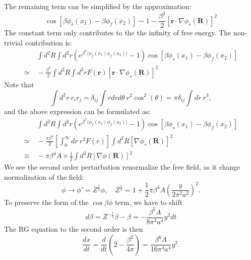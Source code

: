 The remaining term can be simplified by the approximation:
\begin{equation}
	\cos\left[\beta\phi_s(x_1) -\beta\phi_f(x_2)\right]
	\sim 1-\frac{\beta^2}{2} [\bm r \cdot \nabla\phi_s(\bm R)]^2
\end{equation}
The constant term only contributes to the the infinity of free energy.
The non-trivial contribution is:
\begin{equation}
\begin{aligned}
	&\ \int d^2 R \int d^2 r \left(e^{\beta^2 \langle\phi_f(x_1)\phi_f(x_2)\rangle}-1 \right)\cos\left[\beta\phi_s(x_1) -\beta\phi_f(x_2)\right] \\
	\simeq &\ -\frac{\beta^4}{2} \int d^2 R \int d^2r F(\bm r) [\bm r \cdot \nabla\phi_s(\bm R)]^2
\end{aligned}
\end{equation}
Note that
\begin{equation}
	\int d^2r\ r_i r_j = \delta_{ij} \int r dr d\theta\ r^2 \cos^2(\theta) = \pi \delta_{ij} \int dr\ r^3,
\end{equation}
and the above expression can be formulated as:
\begin{equation}
\begin{aligned}
	&\ \int d^2 R \int d^2 r \left(e^{\beta^2 \langle\phi_f(x_1)\phi_f(x_2)\rangle}-1 \right)\cos\left[\beta\phi_s(x_1) -\beta\phi_f(x_2)\right] \\
	\simeq &\ -\frac{\pi \beta^4}{2} \left[\int_0^\infty dr\ r^3 F(r)\right] \int d^2 R [\nabla\phi_s(\bm R)]^2 \\
	\equiv &\ -\pi \beta^4 A \times \frac{1}{2}\int d^2 R [\nabla\phi(\bm R)]^2 
\end{aligned}
\end{equation}
We see the second order perturbation renormalize the free field, as it change normalization of the field:
\begin{equation}
	\phi \rightarrow \phi' = Z^{\frac{1}{2}} \phi, \quad 
	Z^{\frac{1}{2}} = 1 +\frac{1}{2} \pi \beta^4 A \left( \frac{y}{2\pi^2 a^2} \right)^2.
\end{equation}
To preserve the form of the $\cos\beta\phi$ term, we have to shift
\begin{equation}
	d\beta = Z^{-\frac{1}{2}}\beta - \beta = -\frac{\beta^5 A}{8 \pi^3 a^4} y^2 dt
\end{equation}
The RG equation to the second order is then
\begin{equation}
	\frac{dx}{dt} = \frac{d}{dt}\left(2-\frac{\beta^2}{4\pi}\right)
	= \frac{\beta^6 A}{16\pi^4 a^4} y^2.
\end{equation}

